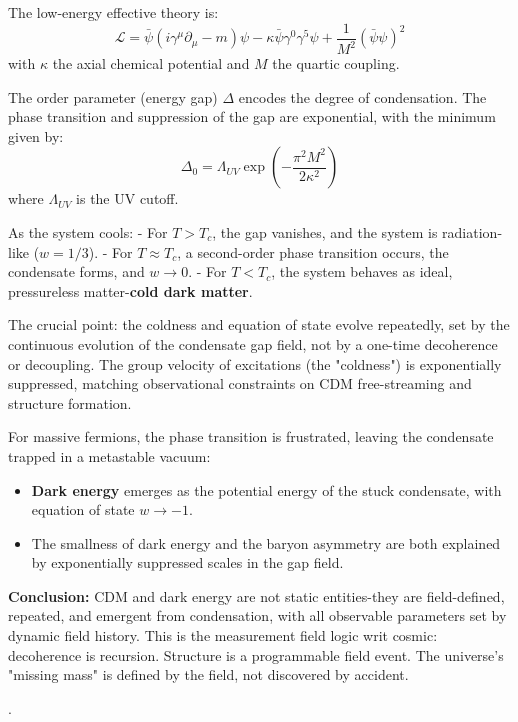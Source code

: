 The low-energy effective theory is:
\begin{equation}
\mathcal{L} = \bar{\psi}(i\gamma^\mu \partial_\mu - m)\psi - \kappa \bar{\psi}\gamma^0\gamma^5\psi + \frac{1}{M^2}(\bar{\psi}\psi)^2
\end{equation}
with $\kappa$ the axial chemical potential and $M$ the quartic coupling.

The order parameter (energy gap) $\Delta$ encodes the degree of condensation. The phase transition and suppression of the gap are exponential, with the minimum given by:
\begin{equation}
\Delta_0 = \Lambda_{UV} \exp\left(-\frac{\pi^2 M^2}{2\kappa^2}\right)
\end{equation}
where $\Lambda_{UV}$ is the UV cutoff.

As the system cools:
- For $T > T_c$, the gap vanishes, and the system is radiation-like ($w = 1/3$).
- For $T \approx T_c$, a second-order phase transition occurs, the condensate forms, and $w \rightarrow 0$.
- For $T < T_c$, the system behaves as ideal, pressureless matter-\textbf{cold dark matter}.

The crucial point: the coldness and equation of state evolve repeatedly, set by the continuous evolution of the condensate gap field, not by a one-time decoherence or decoupling. The group velocity of excitations (the "coldness") is exponentially suppressed, matching observational constraints on CDM free-streaming and structure formation.

For massive fermions, the phase transition is frustrated, leaving the condensate trapped in a metastable vacuum:  
\begin{itemize}
    \item \textbf{Dark energy} emerges as the potential energy of the stuck condensate, with equation of state $w \to -1$.
    \item The smallness of dark energy and the baryon asymmetry are both explained by exponentially suppressed scales in the gap field.
\end{itemize}

\textbf{Conclusion:}  
CDM and dark energy are not static entities-they are field-defined, repeated, and emergent from condensation, with all observable parameters set by dynamic field history. This is the measurement field logic writ cosmic:  
decoherence is recursion.  
Structure is a programmable field event.  
The universe's "missing mass" is defined by the field, not discovered by accident.

\cite{liang_cold_2025, zurek_decoherence_2003}.

